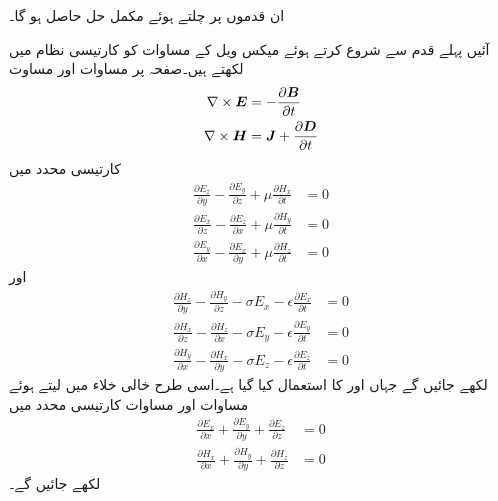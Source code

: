ان قدموں پر چلتے ہوئے مکمل حل حاصل ہو گا۔

آئیں پہلے قدم سے شروع کرتے ہوئے میکس ویل کے مساوات کو کارتیسی نظام میں لکھتے ہیں۔صفحہ  پر مساوات  اور  مساوت 
\begin{align}\label{مساوات_مویج_مستطیلی_پہلا_قدم_شروع}
\nabla \times {\ensuremath{{\boldsymbol{E}}}}&=-\frac{\partial {\ensuremath{{\boldsymbol{B}}}}}{\partial t}\\
\nabla \times {\ensuremath{{\boldsymbol{H}}}}&={{\boldsymbol{J}}}+\frac{\partial {\ensuremath{{\boldsymbol{D}}}}}{\partial t}
\end{align}
کارتیسی محدد میں
\begin{align}
\frac{\partial E_z}{\partial y}-\frac{\partial E_y}{\partial z}+\mu \frac{\partial H_x}{\partial t}&=0  \label{مساوات_مویج_میکس_ویل_الف}\\
\frac{\partial E_x}{\partial z}-\frac{\partial E_z}{\partial x}+\mu \frac{\partial H_y}{\partial t}&=0   \label{مساوات_مویج_میکس_ویل_ب}\\
\frac{\partial E_y}{\partial x}-\frac{\partial E_x}{\partial y}+\mu \frac{\partial H_z}{\partial t}&=0 \label{مساوات_مویج_میکس_ویل_پ}
\end{align}
اور
\begin{align}
\frac{\partial H_z}{\partial y}-\frac{\partial H_y}{\partial z}-\sigma E_x-\epsilon \frac{\partial E_x}{\partial t}&=0  \label{مساوات_مویج_میکس_ویل_ت}\\
\frac{\partial H_x}{\partial z}-\frac{\partial H_z}{\partial x}-\sigma E_y-\epsilon \frac{\partial E_y}{\partial t}&=0  \label{مساوات_مویج_میکس_ویل_ٹ}\\
\frac{\partial H_y}{\partial x}-\frac{\partial H_x}{\partial y}-\sigma E_z-\epsilon \frac{\partial E_z}{\partial t}&=0 \label{مساوات_مویج_میکس_ویل_ث}
\end{align}
لکھے جائیں گے جہاں  اور  کا استعمال کیا گیا ہے۔اسی طرح خالی خلاء میں  لیتے ہوئے  مساوات  اور مساوات  کارتیسی محدد میں
\begin{align}
\frac{\partial E_x}{\partial x}+\frac{\partial E_y}{\partial y}+\frac{\partial E_z}{\partial z}&=0 \label{مساوات_مویج_میکس_ویل_ج}\\
\frac{\partial H_x}{\partial x}+\frac{\partial H_y}{\partial y}+\frac{\partial H_z}{\partial z}&=0 \label{مساوات_مویج_میکس_ویل_چ}
\end{align}
لکھے جائیں گے۔

